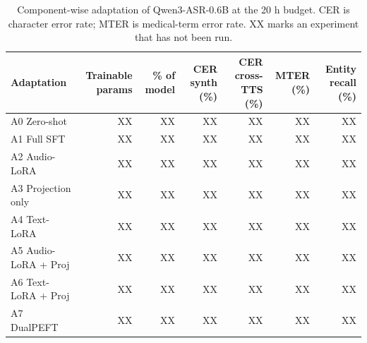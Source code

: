 \begin{table}[t]
\centering
\caption{Component-wise adaptation of Qwen3-ASR-0.6B at the 20 h budget. CER is character error rate; MTER is medical-term error rate. XX marks an experiment that has not been run.}
\label{tab:table1_component_ablation}
\begin{tabular}{lrrrrrr}
\toprule
Adaptation & Trainable params & \% of model & CER synth (\%) & CER cross-TTS (\%) & MTER (\%) & Entity recall (\%) \\
\midrule
A0 Zero-shot & XX & XX & XX & XX & XX & XX \\
A1 Full SFT & XX & XX & XX & XX & XX & XX \\
A2 Audio-LoRA & XX & XX & XX & XX & XX & XX \\
A3 Projection only & XX & XX & XX & XX & XX & XX \\
A4 Text-LoRA & XX & XX & XX & XX & XX & XX \\
A5 Audio-LoRA + Proj & XX & XX & XX & XX & XX & XX \\
A6 Text-LoRA + Proj & XX & XX & XX & XX & XX & XX \\
A7 DualPEFT & XX & XX & XX & XX & XX & XX \\
\bottomrule
\end{tabular}
\end{table}
